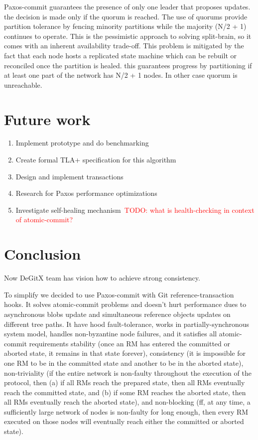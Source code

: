 \documentclass[sigplan, screen, nonacm, 11pt]{acmart}
\newcommand{\todo}[1]{\textcolor{red}{TODO: #1}}
\begin{document}
Paxos-commit guarantees the presence of only one leader that proposes updates.
the decision is made only if the quorum is reached.
The use of quorums provide partition tolerance by fencing minority partitions while the majority (N/2 + 1) continues to operate.
This is the pessimistic approach to solving split-brain,
so it comes with an inherent availability trade-off.
This problem is mitigated by the fact that each node hosts a replicated state machine which can be rebuilt or reconciled once the partition is healed.
this guarantees progress by partitioning if at least one part of the network has N/2 + 1 nodes. In other case quorum is unreachable.

\section{Future work}

\begin{enumerate}
  \item Implement prototype and do benchmarking
  \item Create formal TLA+ specification for this algorithm
  \item Design and implement transactions
  \item Research for Paxos performance optimizations
  \item Investigate self-healing mechanism~\todo{what is health-checking in context of atomic-commit?}
\end{enumerate}

\section{Conclusion}

Now DeGitX team has vision how to achieve strong consistency.

To simplify we decided to use Paxos-commit with Git reference-transaction hooks.
It solves atomic-commit problems and doesn't hurt performance dues to asynchronous blobs update
and simultaneous reference objects updates on different tree paths.
It have hood fault-tolerance, works in partially-synchronous system model,
handles non-byzantine node failures, and it satisfies all atomic-commit requirements
stability (once an RM has entered the committed or aborted state, it remains in that state forever),
consistency (it is impossible for one RM to be in the committed state and another to be in
the aborted state),
non-triviality (if the entire network is non-faulty throughout the execution of the protocol,
then (a) if all RMs reach the prepared state, then all RMs eventually reach the committed state,
and (b) if some RM reaches the aborted state,  then all RMs eventually reach the aborted state),
and non-blocking (ff, at any time, a sufficiently large network of nodes is non-faulty for long enough,
then every RM executed on those nodes will eventually reach either the committed or aborted state).

\newpage



\end{document}
